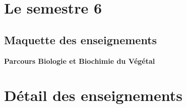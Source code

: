 \documentclass[10pt, a5paper]{report}
\begin{document}
\begin{spacing}{1.5}
\footnotesize

\section*{Le semestre 6}

\subsection*{Maquette des enseignements}

\textbf{Parcours Biologie et Biochimie du Végétal}
\newline



\section*{Détail des enseignements}

\end{spacing}
\end{document}
